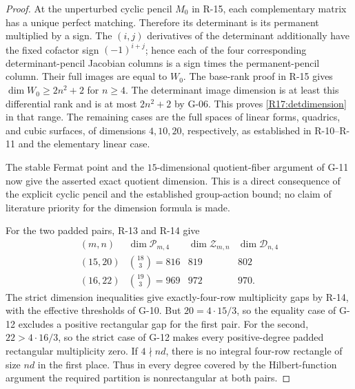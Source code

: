 \begin{proof}
At the unperturbed cyclic pencil $M_0$ in R-15, each
complementary matrix has a unique perfect matching.
Therefore its determinant is its permanent multiplied by a
sign. The $(i,j)$ derivatives of the determinant additionally
have the fixed cofactor sign $(-1)^{i+j}$; hence each of the
four corresponding determinant-pencil Jacobian columns is
a sign times the permanent-pencil column. Their full images
are equal to $W_0$. The base-rank proof in R-15 gives
$\dim W_0\geq2n^2+2$ for $n\geq4$.
The determinant image dimension is at least this differential
rank and is at most $2n^2+2$ by G-06. This proves
\eqref{R17:detdimension} in that range. The remaining cases
are the full spaces of linear forms, quadrics, and cubic
surfaces, of dimensions $4,10,20$, respectively, as established
in R-10--R-11 and the elementary linear case.

The stable Fermat point and the $15$-dimensional quotient-fiber
argument of G-11 now give the asserted exact quotient dimension.
This is a direct consequence of the explicit cyclic pencil and
the established group-action bound; no claim of literature
priority for the dimension formula is made.

For the two padded pairs, R-13 and R-14 give
\[
 \begin{array}{c|c|c|c}
 (m,n)&\dim\mathcal P_{m,4}&\dim\mathcal Z_{m,n}
                    &\dim\mathcal D_{n,4}\\ \hline
 (15,20)&\binom{18}{3}=816&819&802\\
 (16,22)&\binom{19}{3}=969&972&970.
 \end{array}
\]
The strict dimension inequalities give exactly-four-row
multiplicity gaps by R-14, with the effective thresholds of
G-10. But $20=4\cdot15/3$, so the equality case of G-12
excludes a positive rectangular gap for the first pair.
For the second, $22>4\cdot16/3$, so the strict case of G-12
makes every positive-degree padded rectangular multiplicity
zero. If $4\nmid nd$, there is no integral four-row rectangle
of size $nd$ in the first place. Thus in every degree covered
by the Hilbert-function argument the required partition is
nonrectangular at both pairs.
\end{proof}

